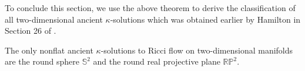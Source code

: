 To conclude this section, we use the above theorem to derive the
classification of all two-dimensional ancient $\kappa$-solutions
which was obtained earlier by Hamilton in Section 26 of
\cite{Ha95F}.

\begin{theorem} 
  \label{thm:cz-two-dimensional-ancient-kappa-classification}

The only nonflat ancient $\kappa$-solutions to Ricci flow on
two-dimensional manifolds are the round sphere $\mathbb{S}^2$ and
the round real projective plane $\mathbb{R}\mathbb{P}^2$.
\end{theorem}

